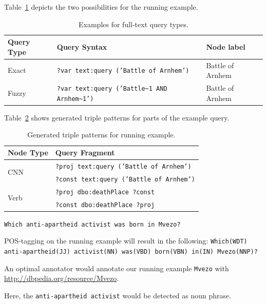 Table~\ref{tab:exact_fuzzy} depicts the two possibilities for the running example.

\begin{table}[htb!]
\centering
\caption{Examples for full-text query types.}
\begin{tabular}{l@{\quad}l@{\quad}l}
\toprule
\textbf{Query Type} & \textbf{Query Syntax} & \textbf{Node label}\\
\midrule
Exact & \texttt{?var text:query ('Battle of Arnhem')}  & Battle of Arnhem\\
Fuzzy & \texttt{?var text:query ('Battle\textasciitilde1 AND Arnhem\textasciitilde 1')} & Battle of Arnhem\\
\bottomrule
\end{tabular}
\label{tab:exact_fuzzy}
\end{table}
Table~\ref{tab:triple_patterns_example} shows generated triple patterns for parts of the example query.
\begin{table}[htb!]
\centering
\caption{Generated triple patterns for running example.}
\begin{tabular}{l@{\quad}l}
\toprule
\textbf{Node Type} & \textbf{Query Fragment} \\
\midrule
\multirow{2}{*}{CNN} & \texttt{?proj text:query ('Battle of Arnhem')} \\
& \texttt{?const text:query ('Battle of Arnhem')} \\
\midrule
\multirow{2}{*}{Verb} & \texttt{?proj dbo:deathPlace ?const} \\
 & \texttt{?const dbo:deathPlace ?proj} \\
\bottomrule
\end{tabular}

\label{tab:triple_patterns_example}
\end{table}

\texttt{Which anti-apartheid activist was born in Mvezo?}


POS-tagging on the running example will result in the following: \texttt{Which(WDT) anti-apartheid(JJ) activist(NN) was(VBD) born(VBN) in(IN) Mvezo(NNP)?}

An optimal annotator would annotate our running example \texttt{Mvezo} with \url{http://dbpedia.org/resource/Mvezo}.

Here, the \texttt{anti-apartheid activist} would be detected as noun phrase.

